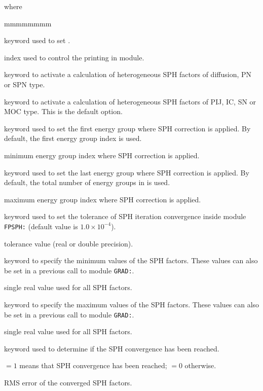 \noindent where
\begin{ListeDeDescription}{mmmmmmmm}

\item[\moc{EDIT}] keyword used to set .

\item[\dusa{iprint}] index used to control the printing in module.

\item[\moc{PN}] keyword to activate a calculation of heterogeneous SPH factors of diffusion, PN or SPN type.

\item[\moc{SN}] keyword to activate a calculation of heterogeneous SPH factors of PIJ, IC, SN or MOC type.
This is the default option.

\item[\moc{GRPMIN}] keyword used to set the first energy group where SPH correction is applied. By default,
the first energy group index is used.

\item[\dusa{ngr1}] minimum energy group index where SPH correction is applied.

\item[\moc{GRPMAX}] keyword used to set the last energy group where SPH correction is applied. By default,
the total number of energy groups in  is used.

\item[\dusa{ngr2}] maximum energy group index where SPH correction is applied.

\item[\moc{OUT-STEP-EPS}] keyword used to set the tolerance of SPH iteration convergence inside module {\tt FPSPH:} (default value
is $1.0 \times 10^{-4}$).

\item[\dusa{$\epsilon_{ext}$}] tolerance value (real or double precision).

\item[\moc{VAR-VAL-MIN}] keyword to specify the minimum values of the SPH factors. These values can also be set in a previous call
to module {\tt GRAD:}.

\item[\dusa{varmin}] single real value used for all SPH factors.

\item[\moc{VAR-VAL-MAX}] keyword to specify the maximum values of the SPH factors. These values can also be set in a previous call
to module {\tt GRAD:}.

\item[\dusa{varmax}] single real value used for all SPH factors.

\item[\moc{OUT-CONV-TST}] keyword used to determine if the SPH convergence has been reached.

\item[\dusa{$l_{conv}$}] $=1$ means that SPH convergence has been reached; $=0$ otherwise.

\item[\dusa{$rms_{conv}$}] RMS error of the converged SPH factors.

\end{ListeDeDescription}
\clearpage
